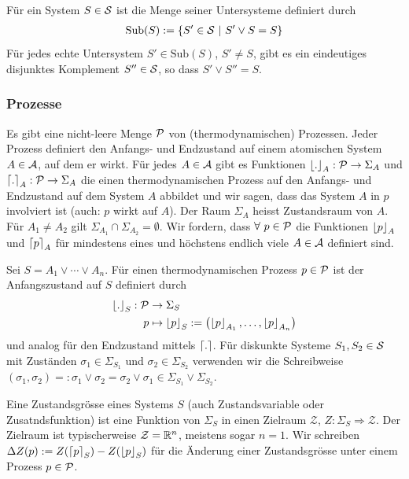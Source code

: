 \begin{definition}[Untersysteme]
    Für ein System $S \in \S$ ist die Menge seiner Untersysteme definiert durch
    \begin{align*}
        \text{Sub}(S) := \geschwungeneklammer{S' \in \S \ | \ S' \vee S = S}
    \end{align*}
    Für jedes echte Untersystem $S' \in \text{Sub}(S)$, $S' \neq S$, gibt es
    ein eindeutiges disjunktes Komplement $S'' \in \S$, so dass $S' \vee S'' = S$.
\end{definition}


\subsubsection{Prozesse}
Es gibt eine nicht-leere Menge $\P$ von (thermodynamischen) Prozessen.
Jeder Prozess definiert den Anfangs- und Endzustand auf einem atomischen
System $A \in \A$, auf dem er wirkt. Für jedes $A \in \A$ gibt es Funktionen
$\floor{.}_A : \P \rightarrow \Sigma_A$ und $\ceil{.}_A : \P \rightarrow
\Sigma_A$ die einen thermodynamischen Prozess auf den Anfangs- und Endzustand
auf dem System $A$ abbildet und wir sagen, dass das System $A$ in $p$
involviert ist (auch: $p$ wirkt auf $A$). Der Raum $\Sigma_A$ heisst
Zustandsraum von $A$. Für $A_1 \neq A_2$ gilt $\Sigma_{A_1} \cap \Sigma_{A_2}
= \emptyset$. Wir fordern, dass $\forall \ p \in \P$ die Funktionen
$\floor{p}_A$ und $\ceil{p}_A$ für mindestens eines und höchstens endlich
viele $A \in \A$ definiert sind.

\begin{definition}
    Sei $S = A_1 \vee \dotsb \vee A_n$. Für einen thermodynamischen
    Prozess $p \in \P$ ist der Anfangszustand auf $S$ definiert durch
    \begin{align*}
        \floor{.}_S : \P &\rightarrow \Sigma_S
        \\
        p &\mapsto \floor{p}_S := \klammer{\floor{p}_{A_1},\dots,\floor{p}_{A_n}}
    \end{align*}
    und analog für den Endzustand mittels $\ceil{.}$. Für diskunkte Systeme
    $S_1 , S_2 \in \S$ mit Zuständen $\sigma_1 \in \Sigma_{S_1}$ und $\sigma_2
    \in \Sigma_{S_2}$ verwenden wir die Schreibweise $(\sigma_1 , \sigma_2) =:
    \sigma_1 \vee \sigma_2 = \sigma_2 \vee \sigma_1 \in \Sigma_{S_1} \vee \Sigma_{S_2}$.
\end{definition}

\begin{definition}[Zustandsgrösse]
    Eine Zustandsgrösse eines Systems $S$ (auch Zustandsvariable oder
    Zusatndsfunktion) ist eine Funktion von $\Sigma_S$ in einen Zielraum
    $\mathcal{Z}$, $Z: \Sigma_S \Rightarrow \mathcal{Z}$. Der Zielraum ist
    typischerweise $\mathcal{Z} = \R^n$, meistens sogar $n=1$. Wir schreiben
    $\Delta Z(p) := Z(\ceil{p}_S) - Z(\floor{p}_S)$ für die Änderung einer
    Zustandsgrösse unter einem Prozess $p \in \P$.
\end{definition}

